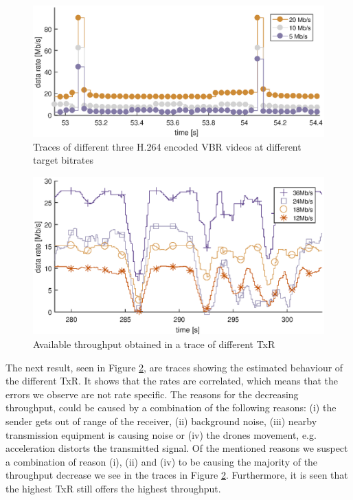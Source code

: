 \begin{figure}[ht]
	\centering
	\includegraphics[width=\linewidth]{images/vids.eps}
	\caption{Traces of different three H.264 encoded VBR videos at different target bitrates}
	\label{fig:vtrace}
\end{figure}
\begin{figure}[ht]
	\centering
	\includegraphics[width=\linewidth]{images/traceAvg10.eps}
	\caption{Available throughput obtained in a trace of different TxR}
	\label{fig:trace}
\end{figure}

The next result, seen in Figure \ref{fig:trace}, are traces showing the estimated behaviour of the different TxR. It shows that the rates are correlated, which means that the errors we observe are not rate specific. The reasons for the decreasing throughput, could be caused by a combination of the following reasons: (i) the sender gets out of range of the receiver, (ii) background noise, (iii) nearby transmission equipment is causing noise or (iv) the drones movement, e.g. acceleration distorts the transmitted signal. Of the mentioned reasons we suspect a combination of reason (i), (ii) and (iv) to be causing the majority of the throughput decrease we see in the traces in Figure \ref{fig:trace}. Furthermore, it is seen that the highest TxR still offers the highest throughput.
